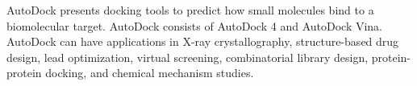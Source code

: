 AutoDock presents docking tools to predict how small molecules bind to a biomolecular target. AutoDock consists of AutoDock 4 and AutoDock Vina. AutoDock can have applications in X-ray crystallography, structure-based drug design, lead optimization, virtual screening, combinatorial library design, protein-protein docking, and chemical mechanism studies.